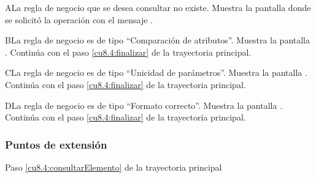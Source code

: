  \begin{UCtrayectoriaA}{A}{La regla de negocio que se desea consultar no existe.}
    \UCpaso[\UCsist] Muestra la pantalla donde se solicitó la operación con el mensaje .
 \end{UCtrayectoriaA} 
 \begin{UCtrayectoriaA}{B}{La regla de negocio es de tipo ``Comparación de atributos''.}
    \UCpaso[\UCsist] Muestra la pantalla .
    \UCpaso[] Continúa con el paso \ref{cu8.4:finalizar} de la trayectoria principal.
 \end{UCtrayectoriaA}
 \begin{UCtrayectoriaA}{C}{La regla de negocio es de tipo ``Unicidad de parámetros''.}
    \UCpaso[\UCsist] Muestra la pantalla .
    \UCpaso[] Continúa con el paso \ref{cu8.4:finalizar} de la trayectoria principal.
 \end{UCtrayectoriaA} 
 \begin{UCtrayectoriaA}{D}{La regla de negocio es de tipo ``Formato correcto''.}
    \UCpaso[\UCsist] Muestra la pantalla .
    \UCpaso[] Continúa con el paso \ref{cu8.4:finalizar} de la trayectoria principal.
 \end{UCtrayectoriaA} 
  
 \subsubsection{Puntos de extensión}
 
 	{Paso \ref{cu8.4:consultarElemento} de la trayectoria principal}
 	{}